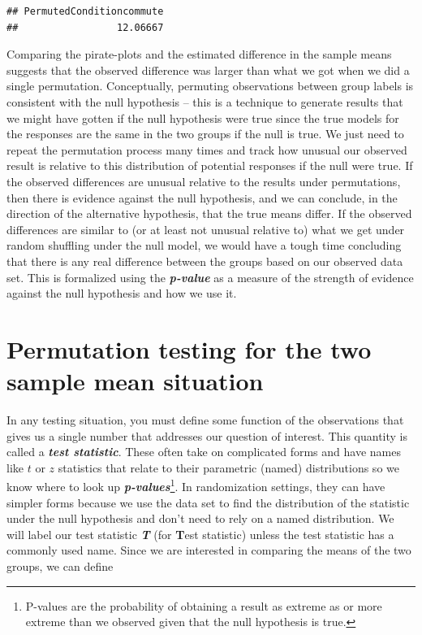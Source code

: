 \documentclass[
]{book}
\begin{document}
\begin{verbatim}
## PermutedConditioncommute 
##                 12.06667
\end{verbatim}

\indent Comparing the pirate-plots and the estimated difference in the sample means suggests that the observed difference was larger than what we got
when we did a single permutation.  Conceptually, permuting observations between group labels is
consistent with the null hypothesis -- this is a technique to generate results
that we might have gotten if the null hypothesis were true since the true models for the responses
are the same in the two groups if the null is true. We just need to repeat the
permutation process many times and track how unusual our observed result is
relative to this distribution of potential responses if the null were true.
If the observed differences are unusual relative to the results under
permutations, then there is evidence against the null hypothesis, and we can conclude,
in the direction of the alternative hypothesis, that the
true means differ. If the observed differences are similar to (or at least not
unusual relative to) what we get under random shuffling under the null model,
we would have a tough time concluding that there is any real difference between
the groups based on our observed data set. This is formalized using the \textbf{\emph{p-value}} as a measure of the strength of evidence against the null hypothesis and how we use it.

\hypertarget{section2-4}{%
\section{Permutation testing for the two sample mean situation}\label{section2-4}}

In any testing situation, you must define some function of the observations that
gives us a single number that addresses our question of interest. This quantity
is called a \textbf{\emph{test statistic}}. These often take on complicated forms and
have names like \(t\) or \(z\) statistics that relate to their parametric
(named)
distributions so we know where to look up
\textbf{\emph{p-values}}\footnote{P-values  are the
  probability of obtaining a result as extreme as or more extreme than we observed
  given that the null hypothesis is true.}. In randomization settings, they can
have simpler forms because we use the data set to find the
distribution of the statistic under the null hypothesis and don't need to rely on a
named distribution. We will label our test statistic \textbf{\emph{T}}
(for \textbf{T}est statistic) unless the test statistic has a commonly
used name. Since we are interested in comparing the means of the two groups, we
can define
\end{document}
